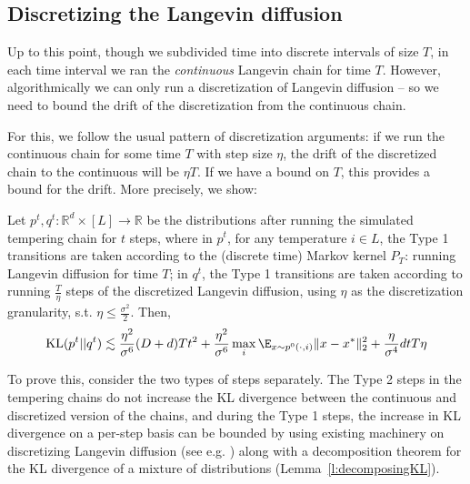 %

\subsection{Discretizing the Langevin diffusion}
\label{sec:discretizeshort}
Up to this point, though we subdivided time into discrete intervals of size $T$, in each time interval we ran the \emph{continuous} Langevin chain for time $T$. However, algorithmically we can only run a discretization of Langevin diffusion -- so we need to bound the drift of the discretization from the continuous chain. 

For this, we follow the usual pattern of discretization arguments: if we run the continuous chain for some time $T$ with step size $\eta$, the drift of the discretized chain to the continuous will be $\eta T$. If we have a bound on $T$, this provides a bound for the drift. More precisely, we show: 

\begin{lem*} Let $p^t, q^t: \mathbb{R}^d \times [L]  \to \mathbb{R}$ be the distributions after running the simulated tempering chain for $t$ steps, where in $p^t$, for any temperature $i \in L$, the Type 1 transitions are taken according to the (discrete time) Markov kernel $P_T$: running Langevin diffusion for time $T$; in $q^t$, the Type 1 transitions are taken according to running $\frac{T}{\eta}$ steps of the discretized Langevin diffusion, using $\eta$ as the discretization granularity, s.t. $\eta \leq \frac{\sigma^2}{2}$.  
Then, 
\begin{align*} \mbox{KL} (p^t || q^t) \lesssim \frac{\eta^2}{\sigma^6} (D+d) T t^2 + \frac{\eta^2}{\sigma^6} \max_i \E_{x \sim p^0( \cdot, i)}\|x - x^*\|_2^2 + \frac{\eta}{\sigma^4} d t T \eta  \end{align*}
\end{lem*} 

To prove this, consider the two types of steps separately. The Type 2 steps in the tempering chains do not increase the KL divergence between the continuous and discretized version of the chains, and during the Type 1 steps, the increase in KL divergence on a per-step basis can be bounded by using existing machinery on discretizing Langevin diffusion (see e.g. \cite{dalalyan2016theoretical}) along with a decomposition theorem for the KL divergence of a mixture of distributions (Lemma~\ref{l:decomposingKL}).  


